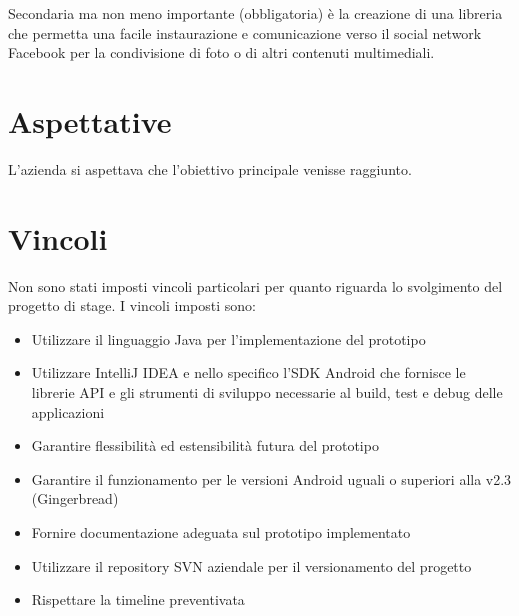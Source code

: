 Secondaria ma non meno importante (obbligatoria) è la creazione di una libreria che permetta una facile instaurazione e comunicazione verso il social network Facebook per la condivisione di foto o di altri contenuti multimediali.


\section{Aspettative}

L'azienda si aspettava che l'obiettivo principale venisse raggiunto.


\section{Vincoli}

Non sono stati imposti vincoli particolari per quanto riguarda lo svolgimento del progetto di stage.
I vincoli imposti sono:
\begin{itemize}
 	\item Utilizzare il linguaggio Java per l'implementazione del prototipo
 	\item Utilizzare IntelliJ IDEA e nello specifico l'SDK Android che fornisce le librerie API e gli strumenti di sviluppo necessarie al build, test e debug delle applicazioni
 	\item Garantire flessibilità ed estensibilità futura del prototipo
 	\item Garantire il funzionamento per le versioni Android uguali o superiori alla v2.3 (Gingerbread)
 	\item Fornire documentazione adeguata sul prototipo implementato
 	\item Utilizzare il repository SVN aziendale per il versionamento del progetto
 	\item Rispettare la timeline preventivata
\end{itemize}

